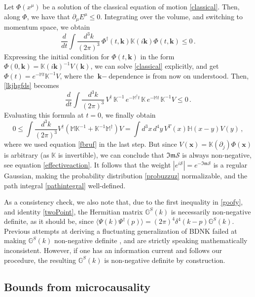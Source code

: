 \documentclass[a4paper, amsfonts, amssymb, amsmath, reprint, showkeys, nofootinbib, twoside,notitlepage,onecolumn]{revtex4-2}
\newcommand{\Ma}{{\mathbb{M}}}
\newcommand{\Ga}{{\mathbb{G}}}
\newcommand{\Ka}{{\mathbb{K}}}
\newcommand{\Ha}{{\mathbb{H}}}
\theoremstyle{definition}
\begin{document}
Let $\Phi(x^\mu)$ be a solution of the classical equation of motion \eqref{classical}. Then, along $\Phi$, we have that $\partial_\mu E^\mu \leq 0$. Integrating over the volume, and switching to momentum space, we obtain
\begin{equation}\label{lkjhgfds}
    \dfrac{d}{dt} \int \dfrac{d^3 k}{(2\pi)^3} \, \Phi^\dagger(t,\textbf{k}) \Ka(i\textbf{k})\Phi(t,\textbf{k}) \leq 0 \, .
\end{equation}
Expressing the initial condition for $\Phi(t,\textbf{k})$ in the form $\Phi(0,\textbf{k})=\Ka(i\textbf{k})^{-1}V(\textbf{k})$, we can solve \eqref{classical} explicitly, and get $\Phi(t)= e^{-\Ma t}\Ka^{-1}V$, where the $\textbf{k}-$dependence is from now on understood. Then, \eqref{lkjhgfds} becomes
\begin{equation}
 \dfrac{d}{dt} \int \dfrac{d^3 k}{(2\pi)^3} \, V^\dagger \, \Ka^{-1} \, e^{-\Ma^\dagger t} \, \Ka \, e^{-\Ma t} \, \Ka^{-1} V \leq 0 \, .   
\end{equation}
Evaluating this formula at $t=0$, we finally obtain
\begin{equation}\label{goofy}
  0 \leq  \int \dfrac{d^3 k}{(2\pi)^3} V^\dagger (\Ma \Ka^{-1}{+}\Ka^{-1}\Ma^\dagger) V = \int d^3 x \, d^4 y \, V^T(x) \Ha(x-y) V(y)   \, ,
\end{equation}
where we used equation \eqref{fbruf} in the last step. But since $V(\textbf{x})=\Ka(\partial_j)\Phi(\textbf{x})$ is arbitrary (as $\Ka$ is invertible), we can conclude that $\mathfrak{Im} \mathcal{S}$ is always non-negative, see equation \eqref{effectiveaction}. It follows that the weight $|e^{i\mathcal{S}}|=e^{\mathfrak{-Im} \mathcal{S}}$ is a regular Gaussian, making the probability distribution \eqref{probuzzuz} normalizable, and the path integral \eqref{pathintegral} well-defined.

As a consistency check, we also note that, due to the first inequality in \eqref{goofy}, and identity \eqref{twoPoint}, the Hermitian matrix $\Ga^S(k)$ is necessarily non-negative definite, as it should be, since $\langle \Psi(k)\Psi^\dagger(p)\rangle=(2\pi)^4 \delta^4(k-p) \Ga^S(k)$. Previous attempts at deriving a fluctuating generalization of BDNK failed at making $\Ga^S(k)$ non-negative definite \cite{Abbasi:2022rum,Mullins:2023ott}, and are strictly speaking mathematically inconsistent. However, if one has an information current and follows our procedure, the resulting $\Ga^S(k)$ is non-negative definite by construction.

\subsection{Bounds from microcausality}\label{micri}
\end{document}
